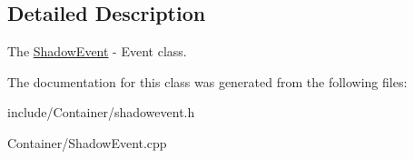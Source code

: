 \subsection{Detailed Description}
The \hyperlink{classEngine_1_1ShadowEvent}{Shadow\+Event} -\/ Event class. 

The documentation for this class was generated from the following files\+:\begin{DoxyCompactItemize}
\item 
include/\+Container/shadowevent.\+h\item 
Container/Shadow\+Event.\+cpp\end{DoxyCompactItemize}
